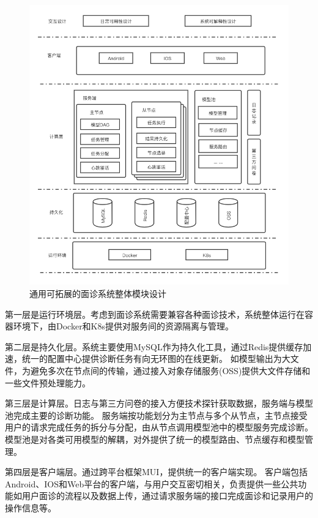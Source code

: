 \begin{figure}
    \centering
    \includegraphics[width=15cm]{images/server_5.png}
    \caption{通用可拓展的面诊系统整体模块设计}
    \label{fig:system}
\end{figure}


第一层是运行环境层。考虑到面诊系统需要兼容各种面诊技术，系统整体运行在容器环境下，由Docker和K8s提供对服务间的资源隔离与管理。

第二层是持久化层。系统主要使用MySQL作为持久化工具，通过Redis提供缓存加速，统一的配置中心提供诊断任务有向无环图的在线更新。
如模型输出为大文件，为避免多次在节点间的传输，通过接入对象存储服务(OSS)提供大文件存储和一些文件预处理能力。

第三层是计算层。日志与第三方问卷的接入方便技术探针获取数据，服务端与模型池完成主要的诊断功能。
服务端按功能划分为主节点与多个从节点，主节点接受用户的请求完成任务的拆分与分配，由从节点调用模型池中的模型服务完成诊断。
模型池是对各类可用模型的解耦，对外提供了统一的模型路由、节点缓存和模型管理。

第四层是客户端层。通过跨平台框架MUI，提供统一的客户端实现。
客户端包括Android、IOS和Web平台的客户端，与用户交互密切相关，负责提供一些公共功能如用户面诊的流程以及数据上传，通过请求服务端的接口完成面诊和记录用户的操作信息等。

